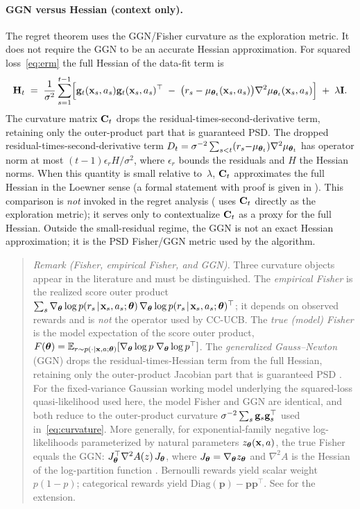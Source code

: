 \paragraph{GGN versus Hessian (context only).}
The regret theorem uses the GGN/Fisher curvature as the exploration
metric.  It does not require the GGN to be an accurate Hessian
approximation.
For squared loss~\eqref{eq:erm} the full Hessian of the data-fit term is
\[
  \mathbf{H}_t \;=\; \frac{1}{\sigma^2}\sum_{s=1}^{t-1}
  \Bigl[\mathbf{g}_t(\mathbf{x}_s,a_s)\mathbf{g}_t(\mathbf{x}_s,a_s)^\top
  \;-\; \bigl(r_s - \mu_{\boldsymbol{\theta}_t}(\mathbf{x}_s,a_s)\bigr)
        \nabla^2\mu_{\boldsymbol{\theta}_t}(\mathbf{x}_s,a_s)\Bigr]
  \;+\;\lambda\mathbf{I}.
\]
The curvature matrix $\mathbf{C}_t$ drops the residual-times-second-derivative
term, retaining only the outer-product part that is guaranteed PSD.
The dropped residual-times-second-derivative term
$D_t=\sigma^{-2}\sum_{s<t}(r_s{-}\mu_{\boldsymbol{\theta}_t})\nabla^2\mu_{\boldsymbol{\theta}_t}$
has operator norm at most
$(t{-}1)\epsilon_r H/\sigma^2$, where $\epsilon_r$ bounds the residuals and
$H$ the Hessian norms.
When this quantity is small relative to~$\lambda$, $\mathbf{C}_t$ approximates
the full Hessian in the Loewner sense (a formal statement with proof is
given in ).
This comparison is \emph{not} invoked in the regret analysis
( uses $\mathbf{C}_t$ directly as the exploration metric);
it serves only to contextualize $\mathbf{C}_t$ as a proxy for the full
Hessian.  Outside the small-residual regime, the GGN is not an exact
Hessian approximation; it is the PSD Fisher/GGN metric used by the
algorithm.

\begin{quote}
\emph{Remark (Fisher, empirical Fisher, and GGN).}
Three curvature objects appear in the literature and must be
distinguished.
The \emph{empirical Fisher} is the realized score outer product
$\sum_s\nabla_{\boldsymbol{\theta}}\log p(r_s\!\mid\!\mathbf{x}_s,a_s;\boldsymbol{\theta})\,
 \nabla_{\boldsymbol{\theta}}\log p(r_s\!\mid\!\mathbf{x}_s,a_s;\boldsymbol{\theta})^\top$;
it depends on observed rewards and is \emph{not} the operator used by
CC-UCB.
The \emph{true (model) Fisher} is the model expectation of the score
outer product,
$F(\boldsymbol{\theta})=\mathbb{E}_{r\sim p(\cdot\mid\mathbf{x},a;\boldsymbol{\theta})}
 [\nabla_{\boldsymbol{\theta}}\log p\;\nabla_{\boldsymbol{\theta}}\log p^\top]$.
The \emph{generalized Gauss--Newton} (GGN) drops the
residual-times-Hessian term from the full Hessian, retaining only the
outer-product Jacobian part that is guaranteed PSD
\citep{martens2020new,schraudolph2002fast}.
For the fixed-variance Gaussian working model underlying the squared-loss
quasi-likelihood used here, the model Fisher and GGN are identical, and both
reduce to the outer-product curvature $\sigma^{-2}\sum_s\mathbf{g}_s\mathbf{g}_s^\top$
used in~\eqref{eq:curvature}.
More generally, for exponential-family negative log-likelihoods
parameterized by natural parameters $z_{\boldsymbol{\theta}}(\mathbf{x},a)$, the true
Fisher equals the GGN:
$J_{\boldsymbol{\theta}}^\top\nabla^2 A(z)\,J_{\boldsymbol{\theta}}$,
where $J_{\boldsymbol{\theta}}=\nabla_{\boldsymbol{\theta}}z_{\boldsymbol{\theta}}$ and
$\nabla^2 A$ is the Hessian of the log-partition function
\citep{martens2020new,pascanu2014revisiting}.
Bernoulli rewards yield scalar weight~$p(1{-}p)$;
categorical rewards yield $\mathrm{Diag}(\mathbf{p})-\mathbf{p}\mathbf{p}^\top$.
See  for the extension.
\end{quote}

